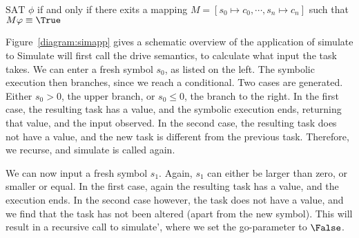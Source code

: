 \begin{figure*}
\caption{Application of the simulation function to Example~\ref{example:abs}}
\label{diagram:simapp}
\end{figure*}

\begin{definition}
  \label{def:Sat}
  $\text{SAT }\phi$ if and only if there exits a mapping $M=[s_0\mapsto c_0,\cdots,s_n\mapsto c_n]$ such that $M\phi\equiv\True$
\end{definition}

Figure~\ref{diagram:simapp} gives a schematic overview of the application of simulate to
Simulate will first call the drive semantics, to calculate what input the task takes.
We can enter a fresh symbol $s_0$, as listed on the left.
The symbolic execution then branches, since we reach a conditional.
Two cases are generated. Either $s_0>0$, the upper branch, or $s_0\leq0$, the  branch to the right.
In the first case, the resulting task has a value, and the symbolic execution ends, returning that value, and the input observed.
In the second case, the resulting task does not have a value, and the new task is different from the previous task.
Therefore, we recurse, and simulate is called again.

We can now input a fresh symbol $s_1$. Again, $s_1$ can either be larger than zero, or smaller or equal.
In the first case, again the resulting task has a value, and the execution ends.
In the second case however, the task does not have a value, and we find that the task has not been altered (apart from the new symbol).
This will result in a recursive call to simulate', where we set the go-parameter to $\False$.

